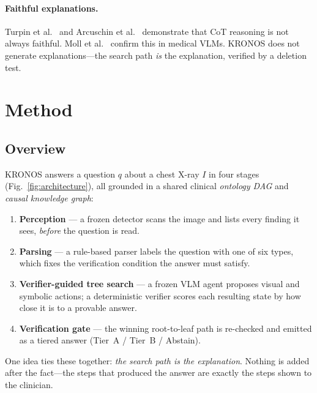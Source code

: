 \documentclass[runningheads]{llncs}
\begin{document}
\paragraph{Faithful explanations.}
Turpin et al.~\cite{turpin2023unfaithful} and
Arcuschin et al.~\cite{arcuschin2025cot} demonstrate that CoT reasoning
is not always faithful.
Moll et al.~\cite{moll2025evaluating} confirm this in medical VLMs.
KRONOS does not generate explanations---the search path \emph{is} the
explanation, verified by a deletion test.

\section{Method}
\label{sec:method}

\subsection{Overview}

KRONOS answers a question $q$ about a chest X-ray $I$ in four stages
(Fig.~\ref{fig:architecture}), all grounded in a shared clinical
\emph{ontology DAG} and \emph{causal knowledge graph}:

\begin{enumerate}
  \item \textbf{Perception} --- a frozen detector scans the image and lists
    every finding it sees, \emph{before} the question is read.
  \item \textbf{Parsing} --- a rule-based parser labels the question with one
    of six types, which fixes the verification condition the answer must satisfy.
  \item \textbf{Verifier-guided tree search} --- a frozen VLM agent proposes
    visual and symbolic actions; a deterministic verifier scores each
    resulting state by how close it is to a provable answer.
  \item \textbf{Verification gate} --- the winning root-to-leaf path is
    re-checked and emitted as a tiered answer (Tier~A / Tier~B / Abstain).
\end{enumerate}

\noindent
One idea ties these together: \emph{the search path is the explanation}.
Nothing is added after the fact---the steps that produced the answer are
exactly the steps shown to the clinician.
\end{document}
